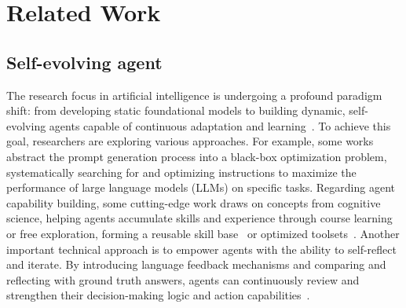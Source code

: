 
\section{Related Work}

\subsection{Self-evolving agent}
The research focus in artificial intelligence is undergoing a profound paradigm shift: from developing static foundational models to building dynamic, self-evolving agents capable of continuous adaptation and learning~\citep{gao2025survey}. To achieve this goal, researchers are exploring various approaches. For example, some works~\citep{zhou2022large, wang2023promptagent, pryzant2023automatic} abstract the prompt generation process into a black-box optimization problem, systematically searching for and optimizing instructions to maximize the performance of large language models (LLMs) on specific tasks. Regarding agent capability building, some cutting-edge work draws on concepts from cognitive science, helping agents accumulate skills and experience through course learning or free exploration, forming a reusable skill base~\citep{wang2023voyager, wu2024copilot, qian2024iterative} or optimized toolsets~\citep{tang2025agent, qiu2025alita}. Another important technical approach is to empower agents with the ability to self-reflect and iterate. By introducing language feedback mechanisms and comparing and reflecting with ground truth answers, agents can continuously review and strengthen their decision-making logic and action capabilities~\citep{shinn2023reflexion, liang2025sage}.


